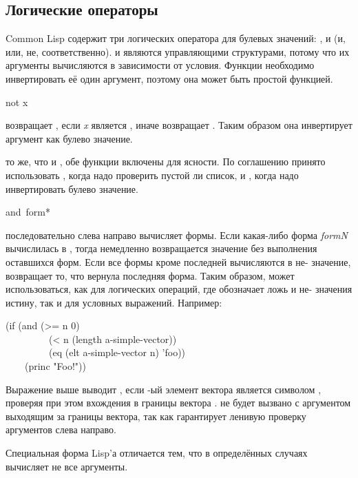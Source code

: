 \begin{defun}[Функция]
\section{Логические операторы}

Common Lisp содержит три логических оператора для булевых значений:
,  и  (и, или, не, соответственно).  и
 являются управляющими структурами, потому что их аргументы
вычисляются в зависимости от условия.
Функции  необходимо инвертировать её один аргумент, поэтому она может
быть простой функцией.

\begin{defun}[Функция]
not x

 возвращает {\true}, если \emph{x} является {\false}, иначе
возвращает {\false}.
Таким образом она инвертирует аргумент как булево значение.

 то же, что и , обе функции включены для ясности. По
соглашению принято использовать , когда надо проверить пустой ли
список, и , когда надо инвертировать булево значение.
\end{defun}

\begin{defmac}
and {\,form}*

 последовательно слева направо
вычисляет формы. Если какая-либо форма \emph{formN} вычислилась в {\false},
тогда немедленно возвращается значение {\nil} без выполнения оставшихся форм. Если все
формы кроме последней вычисляются в не-{\false} значение,  возвращает
то, что вернула последняя форма.
Таким образом,  может использоваться, как для логических операций, где
{\false} обозначает ложь и не-{\false} значения истину, так и для условных
выражений.
Например:
\begin{lisp}
(if (and (>= n 0) \\
~~~~~~~~~(< n (length a-simple-vector)) \\
~~~~~~~~~(eq (elt a-simple-vector n) 'foo)) \\
~~~~(princ "Foo!"))
\end{lisp}
Выражение выше выводит , если -ый элемент вектора
 является символом , проверяя при этом вхождения
 в границы вектора .  не будет вызвано с
аргументом  выходящим за границы вектора, так как  гарантирует
ленивую проверку аргументов слева направо.

Специальная форма Lisp'а  отличается тем, что в определённых случаях
вычисляет не все аргументы.


\end{defmac}
\end{defun}
